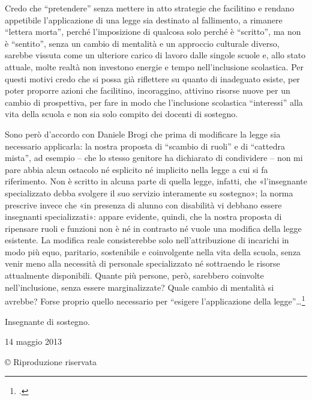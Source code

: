 Credo che “pretendere” senza mettere in atto strategie che facilitino e rendano appetibile l'applicazione di una legge sia destinato al fallimento, a rimanere “lettera morta”, perché l'imposizione di qualcosa solo perché è “scritto”, ma non è “sentito”, senza un cambio di mentalità e un approccio culturale diverso, sarebbe vissuta come un ulteriore carico di lavoro dalle singole scuole e, allo stato attuale, molte realtà non investono energie e tempo nell'inclusione scolastica.
Per questi motivi credo che si possa già riflettere su quanto di inadeguato esiste, per poter proporre azioni che facilitino, incoraggino, attivino risorse nuove per un cambio di prospettiva, per fare in modo che l'inclusione scolastica “interessi” alla vita della scuola e non sia solo compito dei docenti di sostegno.

Sono però d'accordo con Daniele Brogi che prima di modificare la legge sia necessario applicarla: la nostra proposta di “scambio di ruoli” e di “cattedra mista”, ad esempio – che lo stesso genitore ha dichiarato di condividere – non mi pare abbia alcun ostacolo né esplicito né implicito nella legge a cui si fa riferimento. Non è scritto in alcuna parte di quella legge, infatti, che «l'insegnante specializzato debba svolgere il suo servizio interamente su sostegno»; la norma prescrive invece che «in presenza di alunno con disabilità vi debbano essere insegnanti specializzati»: appare evidente, quindi, che la nostra proposta di ripensare ruoli e funzioni non è né in contrasto né vuole una modifica della legge esistente.
La modifica reale consisterebbe solo nell'attribuzione di incarichi in modo più equo, paritario, sostenibile e coinvolgente nella vita della scuola, senza venir meno alla necessità di personale specializzato né sottraendo le risorse attualmente disponibili.
Quante più persone, però, sarebbero coinvolte nell'inclusione, senza essere marginalizzate? Quale cambio di mentalità si avrebbe? Forse proprio quello necessario per “esigere l'applicazione della legge”…\footcite{Giani2013}

Insegnante di sostegno.

14 maggio 2013

© Riproduzione riservata

